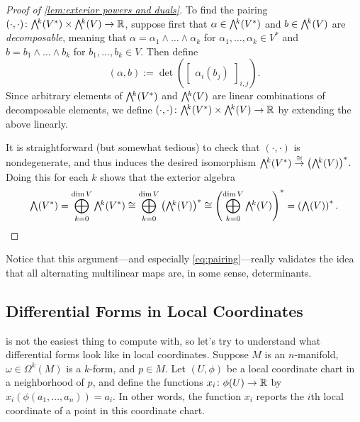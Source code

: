 \begin{proof}[Proof of \cref{lem:exterior powers and duals}]
	To find the pairing $(\cdot , \cdot ) \from \ext{k}(V^\ast) \times \ext{k} (V) \to \R$, suppose first that $\alpha \in \ext{k}(V^\ast)$ and $b \in \ext{k}(V)$ are \emph{decomposable}, meaning that $\alpha = \alpha_1 \wedge \dots \wedge \alpha_k$ for $\alpha_1 , \dots , \alpha_k \in V^\ast$ and $b = b_1 \wedge \dots \wedge b_k$ for $b_1, \dots , b_k \in V$. Then define
	\begin{equation}\label{eq:pairing}
		(\alpha, b) := \det \left( \begin{bmatrix} \alpha_i(b_j) \end{bmatrix}_{i,j}\right).
	\end{equation}
	Since arbitrary elements of $\ext{k}(V^\ast)$ and $\ext{k}(V)$ are linear combinations of decomposable elements, we define $(\cdot , \cdot ) \from \ext{k}(V^\ast) \times \ext{k} (V) \to \R$ by extending the above linearly. 
	
	It is straightforward (but somewhat tedious) to check that $(\cdot , \cdot)$ is nondegenerate, and thus induces the desired isomorphism $\ext{k}(V^\ast) \overset{\cong}{\to} \left(\ext{k}(V)\right)^\ast$. Doing this for each $k$ shows that the exterior algebra
	\[
		\ext{}(V^\ast) = \bigoplus_{k=0}^{\dim V} \ext{k}(V^\ast) \cong \bigoplus_{k=0}^{\dim V} \left(\ext{k}(V)\right)^\ast \cong \left( \bigoplus_{k=0}^{\dim V} \ext{k}(V)\right)^\ast = \left(\ext{}(V)\right)^\ast.
	\]
\end{proof}

Notice that this argument---and especially \eqref{eq:pairing}---really validates the idea that all alternating multilinear maps are, in some sense, determinants. 

\subsection{Differential Forms in Local Coordinates}
\label{sub:differential_forms_in_local_coordinates}

 is not the easiest thing to compute with, so let's try to understand what differential forms look like in local coordinates. Suppose $M$ is an $n$-manifold, $\omega \in \Omega^k(M)$ is a $k$-form, and $p \in M$. Let $(U,\phi)$ be a local coordinate chart in a neighborhood of $p$, and define the functions $x_i \colon\thinspace\! \phi(U) \to \mathbb{R}$ by $x_i(\phi(a_1, \dots , a_n)) = a_i$. In other words, the function $x_i$ reports the $i$th local coordinate of a point in this coordinate chart.

